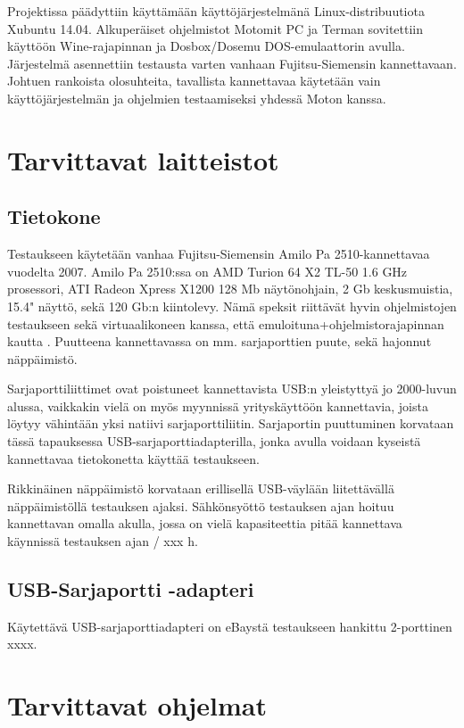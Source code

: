 \documentclass[11pt,a4paper,oneside,article]{memoir}
\begin{document}
Projektissa päädyttiin käyttämään käyttöjärjestelmänä
Linux-distribuutiota Xubuntu 14.04. Alkuperäiset ohjelmistot Motomit PC
ja Terman sovitettiin käyttöön Wine-rajapinnan ja Dosbox/Dosemu
DOS-emulaattorin avulla. Järjestelmä asennettiin testausta varten
vanhaan Fujitsu-Siemensin kannettavaan. Johtuen rankoista olosuhteita,
tavallista kannettavaa käytetään vain käyttöjärjestelmän ja ohjelmien
testaamiseksi yhdessä Moton kanssa.

\section{Tarvittavat laitteistot}
\subsection{Tietokone}
Testaukseen käytetään vanhaa Fujitsu-Siemensin Amilo Pa 2510-kannettavaa vuodelta 2007. Amilo Pa 2510:ssa on AMD Turion 64 X2 TL-50 1.6 GHz prosessori, ATI Radeon Xpress X1200 128 Mb näytönohjain, 2 Gb keskusmuistia, 15.4" näyttö, sekä 120 Gb:n kiintolevy. Nämä speksit riittävät hyvin ohjelmistojen testaukseen sekä virtuaalikoneen kanssa, että emuloituna+ohjelmistorajapinnan kautta \cite{fs_amilo:review}. Puutteena kannettavassa on mm. sarjaporttien puute, sekä hajonnut näppäimistö. 

Sarjaporttiliittimet ovat poistuneet kannettavista USB:n yleistyttyä jo 2000-luvun alussa, vaikkakin vielä on myös myynnissä yrityskäyttöön kannettavia, joista löytyy vähintään yksi natiivi sarjaporttiliitin\cite{hp:laptop}. Sarjaportin puuttuminen korvataan tässä tapauksessa USB-sarjaporttiadapterilla, jonka avulla voidaan kyseistä kannettavaa tietokonetta käyttää testaukseen.

Rikkinäinen näppäimistö korvataan erillisellä USB-väylään liitettävällä näppäimistöllä testauksen ajaksi. Sähkönsyöttö testauksen ajan hoituu kannettavan omalla akulla, jossa on vielä kapasiteettia pitää kannettava käynnissä testauksen ajan / xxx h.

\subsection{USB-Sarjaportti -adapteri}
Käytettävä USB-sarjaporttiadapteri on eBaystä testaukseen hankittu 2-porttinen xxxx. 



\section{Tarvittavat ohjelmat}
\end{document}
